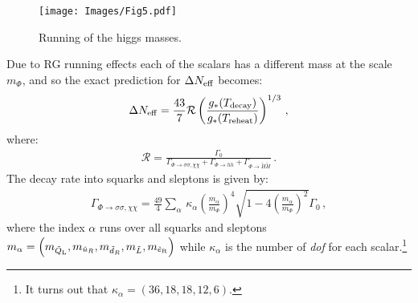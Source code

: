 \documentclass[12pt,a4paper]{book}
\newcommand{\mc}{\mathcal}
\begin{document}
\begin{figure}[!ht]
\begin{center}
\texttt{[image: Images/Fig5.pdf]}
\caption{Running of the higgs masses.}\label{hr}
\end{center}
\end{figure}

Due to RG running effects each of the scalars has a different mass at the scale $m_\Phi$, and so the exact prediction for $\Delta N_{\rm eff}$ becomes:
\begin{align}
\Delta N_{\rm eff} = \frac{43}{7} \mathcal{R} \left(\frac{g_* (T_{\rm decay})}{g_*(T_{\rm reheat})}\right)^{1/3} \,,
\end{align}
where:
\begin{align}
\mc{R} = \frac{\Gamma_0}{\Gamma_{\Phi \rightarrow \sigma\sigma,\chi\chi} + \Gamma_{\Phi \rightarrow hh} + \Gamma_{\Phi \rightarrow \tilde{H} \tilde{H}}}\,.
\end{align}
The decay rate into squarks and sleptons is given by:
\begin{align}
\label{gs}
\Gamma_{\Phi \rightarrow \sigma\sigma,\chi\chi} = \frac{49}{4} \sum_\alpha \, \kappa_\alpha \left(\frac{m_\alpha}{m_\Phi}\right)^4 \sqrt{1 - 4 \left(\frac{m_\alpha}{m_\Phi}\right)^2}\Gamma_0\,,
\end{align}
where the index $\alpha$ runs over all squarks and sleptons $m_\alpha = \left( m_{\tilde{Q}_{\rm L}}, m_{\tilde{u}_R}, m_{\tilde{d}_R}, m_{\tilde{L}}, m_{\tilde{e}_{\rm R}}\right)$ while $\kappa_\alpha$ is the number of \textit{dof} for each scalar.\footnote{It turns out that $\kappa_\alpha = \left(36, 18, 18, 12, 6\right)$.}\\
\end{document}
